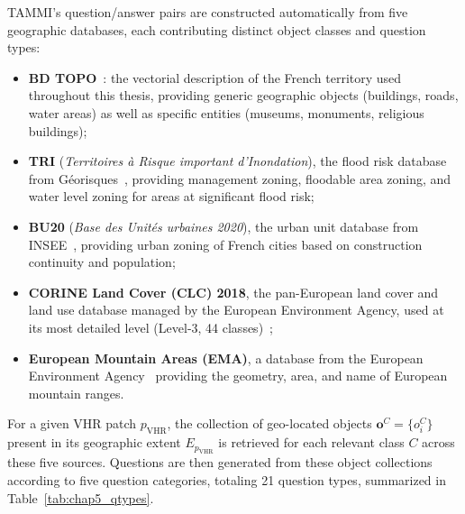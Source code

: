 TAMMI's question/answer pairs are constructed automatically
from five geographic databases, each contributing distinct
object classes and question types:

\begin{itemize}
    \item \textbf{BD TOPO}~\cite{bdtopo}: the vectorial
    description of the French territory used throughout this
    thesis, providing generic geographic objects (buildings,
    roads, water areas) as well as specific entities (museums,
    monuments, religious buildings);
    \item \textbf{TRI} (\textit{Territoires à Risque
    important d'Inondation}), the flood risk
    database from Géorisques~\cite{georisques_tri},
    providing management zoning, floodable area zoning, and
    water level zoning for areas at significant flood risk;
    \item \textbf{BU20} (\textit{Base des Unités urbaines
    2020}), the urban unit database from
    INSEE~\cite{insee_bu20}, providing urban zoning of French
    cities based on construction continuity and population;
    \item \textbf{CORINE Land Cover (CLC) 2018}, the
    pan-European land cover and land use database managed by
    the European Environment Agency, used at its most detailed
    level (Level-3, 44 classes)~\cite{clc2018};
    \item \textbf{European Mountain Areas (EMA)}, a database
    from the European Environment
    Agency~\cite{ema} providing the geometry, area, and name
    of European mountain ranges.
\end{itemize}

For a given VHR patch $p_\text{VHR}$, the collection of
geo-located objects $\mathbf{o}^C = \{o_i^C\}$ present in its
geographic extent $E_{p_\text{VHR}}$ is retrieved for each
relevant class $C$ across these five sources. Questions are
then generated from these object collections according to
five question categories, totaling 21 question types,
summarized in Table~\ref{tab:chap5_qtypes}.

